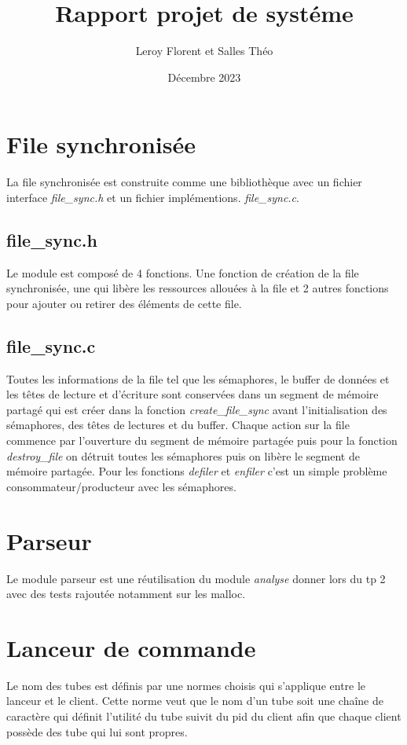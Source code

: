 \documentclass[12pt]{article}
\title{Rapport projet de systéme}
\author{Leroy Florent et Salles Théo}
\date{Décembre 2023}
\begin{document}
\maketitle
\tableofcontents
\newpage
\section{File synchronisée}
La file synchronisée est construite comme une bibliothèque avec un fichier
interface \textit{file\_sync.h} et un fichier implémentions.
\textit{file\_sync.c}.
\subsection{file\_sync.h}
Le module est composé de 4 fonctions. Une fonction de création de la file
synchronisée, une qui libère les ressources allouées à la file et 2 autres
fonctions pour ajouter
ou retirer des éléments de cette file.
\subsection{file\_sync.c}
Toutes les informations de la file tel que les sémaphores, le buffer de données
et les
têtes de lecture
et d'écriture sont conservées dans un segment de mémoire partagé qui est créer
dans la fonction \textit{create\_file\_sync} avant l'initialisation des
sémaphores,
des têtes de lectures et du buffer.
Chaque action sur la file commence par l'ouverture du segment de mémoire
partagée
puis pour la fonction \textit{destroy\_file} on détruit toutes les sémaphores
puis on libère le segment de mémoire partagée. Pour les fonctions
\textit{defiler} et \textit{enfiler}
c'est un simple problème consommateur/producteur avec les sémaphores.
\section{Parseur}
Le module parseur est une réutilisation du module \textit{analyse} donner lors
du tp 2
avec des tests rajoutée notamment sur les malloc.
\section{Lanceur de commande}
Le nom des tubes est définis par une normes choisis qui s'applique
entre le lanceur et le client. Cette norme veut que le nom d'un tube soit une
chaîne de caractère qui
définit l'utilité du tube suivit du pid du client afin que chaque client
possède des tube qui lui sont propres.
\end{document}
